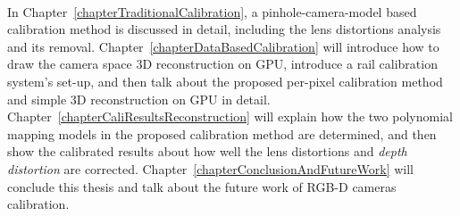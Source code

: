 \\\indent
In Chapter~\ref{chapterTraditionalCalibration}, a pinhole-camera-model based calibration method is discussed in detail, including the lens distortions analysis and its removal. Chapter~\ref{chapterDataBasedCalibration} will introduce how to draw the camera space 3D reconstruction on GPU, introduce a rail calibration system's set-up, and then talk about the proposed per-pixel calibration method and simple 3D reconstruction on GPU in detail. Chapter~\ref{chapterCaliResultsReconstruction} will explain how the two polynomial mapping models in the proposed calibration method are determined, and then show the calibrated results about how well the lens distortions and \emph{depth distortion} are corrected. Chapter~\ref{chapterConclusionAndFutureWork} will conclude this thesis and talk about the future work of RGB-D cameras calibration.

